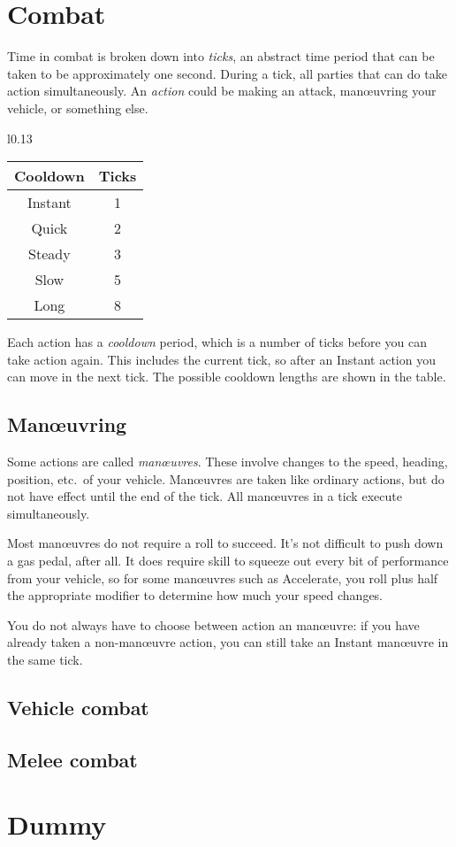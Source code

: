 \documentclass[10pt, a4paper, twocolumn]{article}
\begin{document}
\section{Combat}
Time in combat is broken down into \emph{ticks}, an abstract time period that
can be taken to be approximately one second. During a tick, all parties that
can do take action simultaneously. An \emph{action} could be making an attack,
man\oe{}uvring your vehicle, or something else.

\begin{wraptable}[7]{l}{0.13\textwidth}
\vspace*{-3ex}
\begin{tabular}{cc}
  Cooldown & Ticks \\
  \hline 
  Instant  & 1     \\
  Quick    & 2     \\
  Steady   & 3     \\
  Slow     & 5     \\
  Long     & 8
\end{tabular}
\end{wraptable}

Each action has a \emph{cooldown} period, which is a number of ticks before you
can take action again. This includes the current tick, so after an Instant
action you can move in the next tick. The possible cooldown lengths are shown in
the table. 

\subsection{Man\oe{}uvring}
Some actions are called \emph{man\oe{}uvres}. These involve changes to the speed,
heading, position, etc.\ of your vehicle. Man\oe{}uvres are taken like ordinary
actions, but do not have effect until the end of the tick. All man\oe{}uvres in a
tick execute simultaneously.

Most man\oe{}uvres do not require a roll to succeed. It's not difficult to push
down a gas pedal, after all. It does require skill to squeeze out every bit of
performance from your vehicle, so for some man\oe{}uvres such as Accelerate, you
roll  plus half the appropriate modifier to determine how much your
speed changes.

You do not always have to choose between action an man\oe{}uvre: if you have
already taken a non-man\oe{}uvre action, you can still take an Instant
man\oe{}uvre in the same tick. 



\subsection{Vehicle combat}
\subsection{Melee combat}

\section{Dummy}
\lipsum{}
\end{document}
